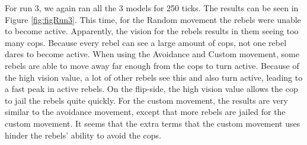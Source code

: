 \documentclass[a4paper,11pt]{article}
\begin{document}
For run 3, we again ran all the 3 models for 250 ticks. The results can be seen in Figure \ref{fig:figRun3}. This time, for the Random movement the rebels were unable to become active. Apparently, the vision for the rebels results in them seeing too many cops. Because every rebel can see a large amount of cops, not one rebel dares to become active. When using the Avoidance and Custom movement, some rebels are able to move away far enough from the cops to turn active. Because of the high vision value, a lot of other rebels see this and also turn active, leading to a fast peak in active rebels. On the flip-side, the high vision value allows the cop to jail the rebels quite quickly. For the custom movement, the results are very similar to the avoidance movement, except that more rebels are jailed for the custom movement. It seems that the extra terms that the custom movement uses hinder the rebels' ability to avoid the cops.
\end{document}
